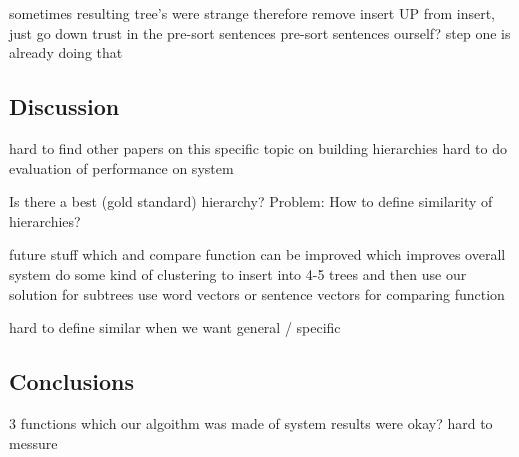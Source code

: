 sometimes resulting tree's were strange
therefore remove insert UP from insert, just go down
trust in the pre-sort sentences
pre-sort sentences ourself? step one is already doing that

\subsection{Discussion}

hard to find other papers on this specific topic on building hierarchies
hard to do evaluation of performance on system

Is there a best (gold standard) hierarchy?
Problem: How to define similarity of hierarchies?

future stuff
which and compare function can be improved which improves overall system
do some kind of clustering to insert into 4-5 trees and then use our solution for subtrees
use word vectors or sentence vectors for comparing function

hard to define similar when we want general / specific

\subsection{Conclusions}

3 functions which our algoithm was made of
system results were okay?
hard to messure


